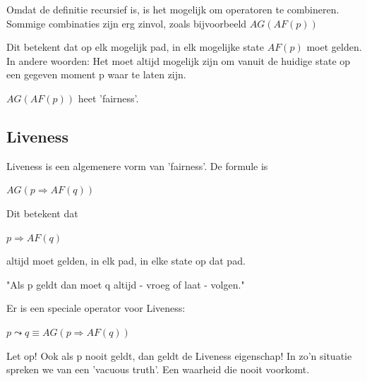 \documentclass{article}
\begin{document}
		Omdat de definitie recursief is, is het mogelijk om operatoren te combineren. Sommige combinaties zijn erg zinvol, zoals bijvoorbeeld \( AG ( AF (p) )\)

		Dit betekent dat op elk mogelijk pad, in elk mogelijke state \( AF(p) \) moet gelden. In andere woorden: Het moet altijd mogelijk zijn om vanuit de huidige state op een gegeven moment p waar te laten zijn. 

		\( AG ( AF ( p ) ) \) heet 'fairness'.
		
		\subsection{Liveness}
			
		Liveness is een algemenere vorm van 'fairness'. De formule is 

		\( AG (p \Rightarrow AF(q)) \) 

		Dit betekent dat 

		 \( p \Rightarrow AF(q) \) 

		altijd moet gelden, in elk pad, in elke state op dat pad.

		"Als p geldt dan moet q altijd - vroeg of laat - volgen."

		Er is een speciale operator voor Liveness:

		\( p \leadsto q \equiv AG (p \Rightarrow AF (q) ) \)

		Let op! Ook als p nooit geldt, dan geldt de Liveness eigenschap! In zo'n situatie spreken we van een 'vacuous truth'. Een waarheid die nooit voorkomt.
		
	
	\newpage
	
	
	 
	
\end{document}
